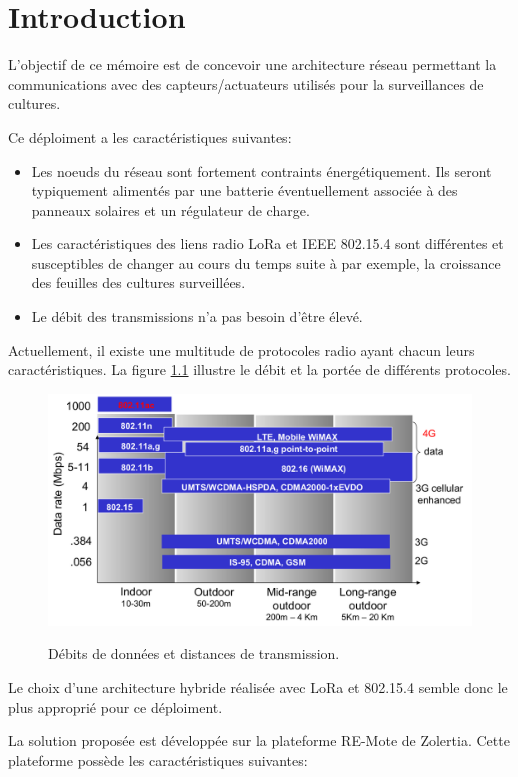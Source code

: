 \renewcommand{\leftmark}{INTRODUCTION}
\chapter{Introduction}\label{chap:intro}

L'objectif de ce mémoire est de concevoir une architecture réseau permettant la communications avec des capteurs/actuateurs utilisés pour la surveillances de cultures.

Ce déploiment a les caractéristiques suivantes:
\begin{itemize}
    \item Les noeuds du réseau sont fortement contraints énergétiquement. Ils seront typiquement alimentés
    par une batterie éventuellement associée à des panneaux solaires et un régulateur de charge.
    \item Les caractéristiques des liens radio LoRa et IEEE 802.15.4 sont différentes et susceptibles
    de changer au cours du temps suite à par exemple, la croissance des feuilles des cultures surveillées.
    \item Le débit des transmissions n'a pas besoin d'être élevé.
\end{itemize}

Actuellement, il existe une multitude de protocoles radio ayant chacun leurs caractéristiques.
La figure \ref{fig:intro-linkStandard} illustre le débit et la portée de différents protocoles.

\begin{figure}
    \centering
    \includegraphics[scale=0.3]{res/pictures/link-standard.png}
    \label{fig:intro-linkStandard}
    \caption{Débits de données et distances de transmission.}
\end{figure}

Le choix d'une architecture hybride réalisée avec LoRa et 802.15.4 semble donc le plus approprié
pour ce déploiment.

La solution proposée est développée sur la plateforme RE-Mote de Zolertia.
Cette plateforme possède les caractéristiques suivantes:

